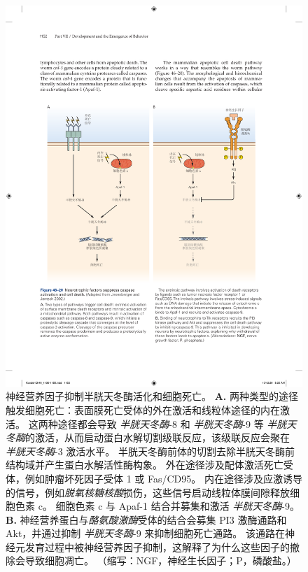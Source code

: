 \begin{figure}[htbp]
	\centering
	\includegraphics[width=1.0\linewidth]{chap46/fig_46_20}
	\caption{神经营养因子抑制半胱天冬酶活化和细胞死亡\cite{jesenberger2002deadly}。
		\textbf{A.} 两种类型的途径触发细胞死亡：表面膜死亡受体的外在激活和线粒体途径的内在激活。
		这两种途径都会导致 \textit{半胱天冬酶}-8 和 \textit{半胱天冬酶}-9 等 \textit{半胱天冬酶}的激活，从而启动蛋白水解切割级联反应，该级联反应会聚在 \textit{半胱天冬酶}-3 激活水平。
		半胱天冬酶前体的切割去除半胱天冬酶前结构域并产生蛋白水解活性酶构象。
		外在途径涉及配体激活死亡受体，例如肿瘤坏死因子受体 1 或 Fas/CD95。
		内在途径涉及应激诱导的信号，例如\textit{脱氧核糖核酸}损伤，这些信号启动线粒体膜间隙释放细胞色素 c。
		细胞色素 c 与 Apaf-1 结合并募集和激活 \textit{半胱天冬酶}-9。
		\textbf{B.} 神经营养蛋白与\textit{酪氨酸激酶}受体的结合会募集 PI3 激酶通路和 Akt，并通过抑制 \textit{半胱天冬酶}-9 来抑制细胞死亡通路。
		该通路在神经元发育过程中被神经营养因子抑制，这解释了为什么这些因子的撤除会导致细胞凋亡。
		（缩写：NGF，神经生长因子；P，磷酸盐。）}
	\label{fig:46_20}
\end{figure}


